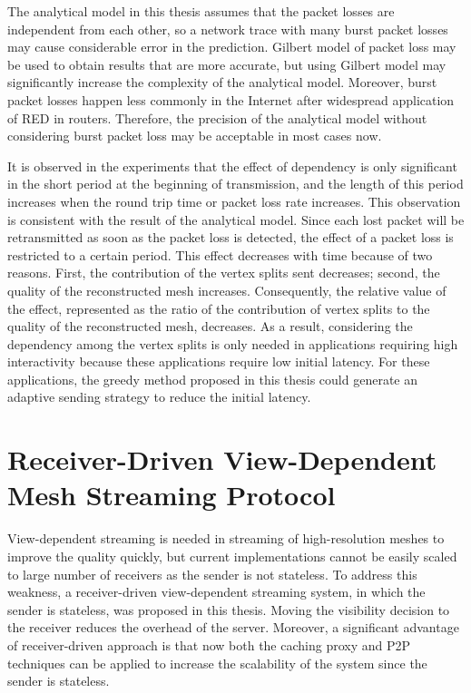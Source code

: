 The analytical model in this thesis assumes that the packet losses 
are independent from each other, 
so a network trace with many burst packet losses may cause considerable error in the prediction. 
Gilbert model of packet loss may be used to obtain results that are more accurate, 
but using Gilbert model may significantly increase the complexity of the analytical model. 
Moreover, burst packet losses happen less commonly in the Internet
after widespread application of RED in routers. 
Therefore, the precision of the analytical model
without considering burst packet loss may be acceptable in most cases now.

It is observed in the experiments that the effect of dependency
is only significant in the short period at the beginning of transmission, 
and the length of this period increases
when the round trip time or packet loss rate increases. 
This observation is consistent with the result of the analytical model. 
Since each lost packet will be retransmitted as soon as the packet loss is detected, 
the effect of a packet loss is restricted to a certain period. 
This effect decreases with time because of two reasons. 
First, the contribution of the vertex splits sent decreases; 
second, the quality of the reconstructed mesh increases. 
Consequently, the relative value of the effect, 
represented as the ratio of the contribution of vertex
splits to the quality of the reconstructed mesh, decreases.
As a result, considering the dependency among the vertex splits 
is only needed in applications requiring high interactivity
because these applications require low initial latency. 
For these applications, the greedy method proposed in this thesis
could generate an adaptive sending strategy to reduce the initial latency. 

\section{Receiver-Driven View-Dependent Mesh Streaming Protocol}
View-dependent streaming is needed in streaming of high-resolution meshes
to improve the quality quickly, but current implementations cannot be easily scaled
to large number of receivers as the sender is not stateless. 
To address this weakness, a receiver-driven view-dependent streaming system,
in which the sender is stateless, was proposed in this thesis. 
Moving the visibility decision to the receiver reduces the overhead of the server. 
Moreover, a significant advantage of receiver-driven approach is that
now both the caching proxy and P2P techniques can be applied to increase the scalability of the system
since the sender is stateless. 

